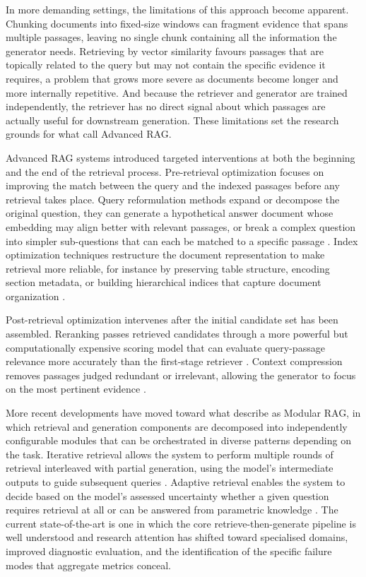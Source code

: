 \documentclass[12pt,twoside,maitrise]{dms}
\theoremstyle{definition}
\numberwithin{equation}{section}
\numberwithin{table}{chapter}
\numberwithin{figure}{chapter}
\begin{document}
In more demanding settings, the limitations of this approach become apparent. Chunking
documents into fixed-size windows can fragment evidence that spans multiple passages,
leaving no single chunk containing all the information the generator needs. Retrieving
by vector similarity favours passages that are topically related to the query but may
not contain the specific evidence it requires, a problem that grows more severe as
documents become longer and more internally repetitive. And because the retriever and
generator are trained independently, the retriever has no direct signal about which
passages are actually useful for downstream generation. These limitations set the
research grounds for what \citet{gao2023retrieval} call Advanced RAG.

Advanced RAG systems introduced targeted interventions at both the beginning and the end
of the retrieval process. Pre-retrieval optimization focuses on improving the match
between the query and the indexed passages before any retrieval takes place. Query
reformulation methods expand or decompose the original question, they can generate a
hypothetical answer document whose embedding may align better with relevant passages, or
break a complex question into simpler sub-questions that can each be matched to a
specific passage \citep{gao2023precise, ma2023query, karpukhin2020dense}. Index optimization techniques
restructure the document representation to make retrieval more reliable, for instance by
preserving table structure, encoding section metadata, or building hierarchical indices
that capture document organization \citep{gao2023retrieval}.

Post-retrieval optimization intervenes after the initial candidate set has been
assembled. Reranking passes retrieved candidates through a more powerful but
computationally expensive scoring model that can evaluate query-passage relevance more
accurately than the first-stage retriever \citep{nogueira2019document}. Context
compression removes passages judged redundant or irrelevant, allowing the generator to
focus on the most pertinent evidence \citep{xu2023recomp}.

More recent developments have moved toward what \citet{gao2023retrieval} describe as
Modular RAG, in which retrieval and generation components are decomposed into
independently configurable modules that can be orchestrated in diverse patterns depending
on the task. Iterative retrieval allows the system to perform multiple rounds of
retrieval interleaved with partial generation, using the model's intermediate outputs
to guide subsequent queries \citep{shao2023enhancing}. Adaptive retrieval enables the
system to decide based on the model's assessed uncertainty whether a given question
requires retrieval at all or can be answered from parametric knowledge
\citep{jiang2023active}. The current state-of-the-art is one in which the core
retrieve-then-generate pipeline is well understood and research attention has shifted
toward specialised domains, improved diagnostic evaluation, and the identification of
the specific failure modes that aggregate metrics conceal.
\end{document}
